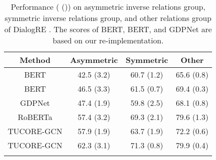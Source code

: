 \documentclass[11pt]{article}
\begin{document}
\begin{table*}
\centering
{\small
\begin{tabular}{c|ccc}
\Xhline{3\arrayrulewidth}
\textbf{Method} & \textbf{Asymmetric} & \textbf{Symmetric} & \textbf{Other}\\
\hline
BERT \citep{devlin-etal-2019-bert} & 42.5 (3.2) & 60.7 (1.2) & 65.6 (0.8) \\ 
BERT \citep{yu-etal-2020-dialogue} & 46.5 (3.3) & 61.5 (0.7) & 69.4 (0.3) \\ 
GDPNet \citep{DBLP:conf/aaai/XueSZC21} & 47.4 (1.9) & 59.8 (2.5) & 68.1 (0.8) \\ 
RoBERTa & 57.4 (3.2) & 69.3 (2.1) & 79.6 (1.3) \\ 
\hline
TUCORE-GCN & 57.9 (1.9) & 63.7 (1.9) & 72.2 (0.6) \\
TUCORE-GCN & 62.3 (3.1) & 71.3 (0.8) & 79.9 (0.4) \\
\Xhline{3\arrayrulewidth}
\end{tabular}
}
\caption{\label{analysis} Performance ( ()) on asymmetric inverse relations group, symmetric inverse relations group, and other relations group of DialogRE \citep{yu-etal-2020-dialogue}. The scores of BERT, BERT, and GDPNet are based on our re-implementation.}
\end{table*}
\end{document}
